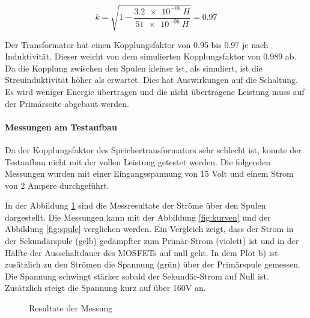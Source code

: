 \begin{equation}\label{eq:berechnung_k2}
k = \sqrt{1-\frac{\SI{3.2e-06}{H}}{\SI{51e-06}{H}}}=0.97
\end{equation}

Der Transformator hat einen Kopplungsfaktor von 0.95 bis 0.97 je nach Induktivität. Dieser weicht von dem simulierten Kopplungsfaktor von 0.989 ab. Da die Kopplung zwischen den Spulen kleiner ist, als simuliert, ist die Streuinduktivität höher als erwartet. Dies hat Auswirkungen auf die Schaltung. Es wird weniger Energie übertragen und die nicht übertragene Leistung muss auf der Primärseite abgebaut werden.  

\paragraph{Messungen am Testaufbau}
Da der Kopplungsfaktor des Speichertransformators sehr schlecht ist, konnte der Testaufbau nicht mit der vollen Leistung getestet werden. Die folgenden Messungen wurden mit einer Eingangsspannung von 15 Volt und einem Strom von 2 Ampere durchgeführt.   

In der Abbildung \ref{fig:mess_ströme} sind die Messresultate der Ströme über den Spulen dargestellt. Die Messungen kann mit der Abbildung \ref{fig:kurven} und der Abbildung \ref{fig:spule} verglichen werden. Ein Vergleich zeigt, dass der Strom in der Sekundärspule (gelb) gedämpfter zum Primär-Strom (violett) ist und in der Hälfte der Ausschaltdauer des MOSFETs auf null geht. In dem Plot b) ist zusätzlich zu den Strömen die Spannung (grün) über der Primärspule gemessen. Die Spannung schwingt stärker sobald der Sekundär-Strom auf Null ist. Zusätzlich steigt die Spannung kurz auf über 160V an. 

\begin{figure}[H]
	\centering
	\qquad
	\caption{Resultate der Messung}
	\label{fig:mess_ströme}
\end{figure}
